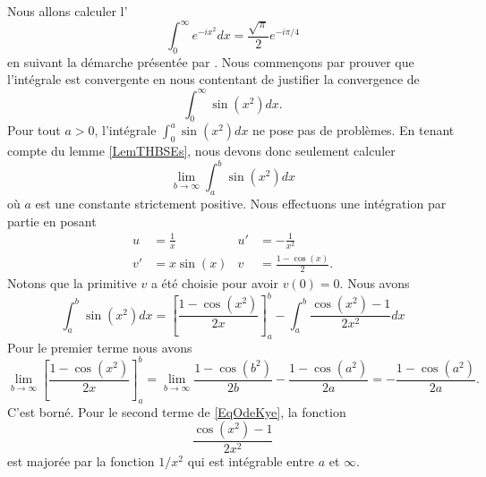 Nous allons calculer l'
\begin{equation}
    \int_0^{\infty} e^{-ix^2}dx=\frac{ \sqrt{\pi} }{ 2 } e^{-i\pi/4}
\end{equation}
en suivant la démarche présentée par . Nous commençons par prouver que l'intégrale est convergente en nous contentant de justifier la convergence de
\begin{equation}
    \int_0^{\infty}\sin(x^2)dx.
\end{equation}
Pour tout \( a>0\), l'intégrale \( \int_0^a\sin(x^2)dx\) ne pose pas de problèmes. En tenant compte du lemme \ref{LemTHBSEs}, nous devons donc seulement calculer
\begin{equation}
    \lim_{b\to \infty}\int_a^b\sin(x^2)dx
\end{equation}
où \( a\) est une constante strictement positive. Nous effectuons une intégration par partie en posant
\begin{subequations}
    \begin{align}
        u&=\frac{1}{ x }&   u'&=-\frac{1}{ x^2 }\\
        v'&=x\sin(x)    & v&=\frac{ 1-\cos(x) }{2}.
    \end{align}
\end{subequations}
Notons que la primitive \( v\) a été choisie pour avoir \( v(0)=0\). Nous avons
\begin{equation}    \label{EqOdeKye}
    \int_a^b\sin(x^2)dx=\left[ \frac{ 1-\cos(x^2) }{ 2x } \right]_a^b-\int_a^b\frac{ \cos(x^2)-1 }{ 2x^2 }dx
\end{equation}
Pour le premier terme nous avons
\begin{equation}
    \lim_{b\to \infty}\left[ \frac{ 1-\cos(x^2) }{ 2x } \right]_a^b=\lim_{b\to \infty}\frac{ 1-\cos(b^2) }{ 2b }-\frac{ 1-\cos(a^2) }{ 2a }=-\frac{ 1-\cos(a^2) }{ 2a }.
\end{equation}
C'est borné. Pour le second terme de \eqref{EqOdeKye}, la fonction
\begin{equation}
    \frac{ \cos(x^2)-1 }{ 2x^2 }
\end{equation}
est majorée par la fonction \( 1/x^2\) qui est intégrable entre \( a\) et \( \infty\).


